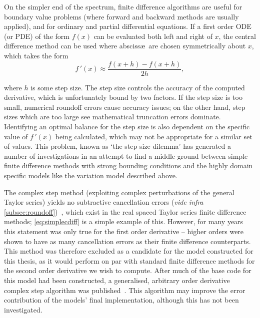 On the simpler end of the spectrum, finite difference algorithms are useful for boundary value problems (where forward and backward methods are usually applied), and for ordinary and partial differential equations.
If a first order ODE (or PDE) of the form $f(x)$ can be evaluated both left and right of $x$, the central difference method can be used where absciss\ae\ are chosen symmetrically about $x$, which takes the form
\begin{equation}
f\,'(x) \approx \frac{f(x+h)-f(x+h)}{2h},\label{eq:simplecdiff}
\end{equation}

where $h$ is some step size.
The step size controls the accuracy of the computed derivative, which is unfortunately bound by two factors.
If the step size is too small, numerical roundoff errors cause accuracy issues; on the other hand, step sizes which are too large see mathematical truncation errors dominate.
Identifying an optimal balance for the step size is also dependent on the specific value of $f\,'(x)$ being calculated, which may not be appropriate for a similar set of values.
This problem, known as `the step size dilemma' has generated a number of investigations in an attempt to find a middle ground between simple finite difference methods with strong bounding conditions and the highly domain specific models like the variation model described above.

The complex step method (exploiting complex perturbations of the general Taylor series) yields no subtractive cancellation errors (\emph{vide infra} \cref{subsec:roundoff})~\cite{Squire1998}, which exist in the real spaced Taylor series finite difference methods; \cref{eq:simplecdiff} is a simple example of this.
However, for many years this statement was only true for the first order derivative -- higher orders were shown to have as many cancellation errors as their finite difference counterparts.
This method was therefore excluded as a candidate for the model constructed for this thesis, as it would perform on par with standard finite difference methods for the second order derivative we wish to compute.
After much of the base code for this model had been constructed, a generalised, arbitrary order derivative complex step algorithm was published~\cite{Lantoine2012}.
This algorithm may improve the error contribution of the models' final implementation, although this has not been investigated.

